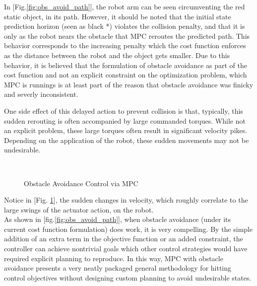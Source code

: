 \documentclass[journal]{IEEEtran}
\begin{document}
In [Fig.\ref{fig:obs_avoid_path}], the robot arm can be seen circumventing the red static object, in its path. However, it should be noted that the initial state prediction horizon (seen as black *) violates the collision penalty, and that it is only as the robot nears the obstacle that MPC reroutes the predicted path. This behavior corresponds to the increasing penalty which the cost function enforces as the distance between the robot and the object gets smaller. Due to this behavior, it is believed that the formulation of obstacle avoidance as part of the cost function and not an explicit constraint on the optimization problem, which MPC is runnings is at least part of the reason that obstacle avoidance was finicky and severly inconsistent.

One side effect of this delayed action to prevent collision is that, typically, this sudden rerouting is often accompanied by large commanded torques. While not an explicit problem, these large torques often result in significant velocity pikes. Depending on the application of the robot, these sudden movements may not be undesirable. \\

\begin{figure}[ht]%
    \centering
    \\
    \caption{Obstacle Avoidance Control via MPC}%
    \label{fig:obs_avoid_control_action}%
\end{figure}



\noindent Notice in [Fig. \ref{fig:obs_avoid_control_action}], the sudden changes in velocity, which roughly correlate to the large swings of the actuator action, on the robot. \\

As shown in [fig.\ref{fig:obs_avoid_path}], when obstacle avoidance (under its current cost function formulation) does work, it is very compelling. By the simple addition of an extra term in the objective function or an added constraint, the controller can achieve nontrivial goals which other control strategies would have required explicit planning to reproduce. In this way, MPC with obstacle avoidance presents a very neatly packaged general methodology for hitting control objectives without designing custom planning to avoid undesirable states. \\
\end{document}
